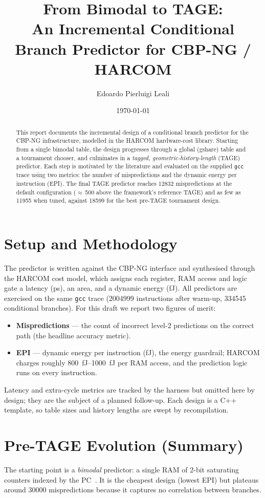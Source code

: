 \documentclass[11pt]{article}
\title{\vspace{-1.0cm}From Bimodal to TAGE:\\
An Incremental Conditional Branch Predictor for CBP-NG / HARCOM}
\author{Edoardo Pierluigi Leali}
\date{\today}
\newcommand{\code}[1]{\texttt{\small #1}}
\begin{document}
\maketitle
\vspace{-0.6cm}

\begin{abstract}
\noindent
This report documents the incremental design of a conditional branch predictor
for the CBP-NG infrastructure, modelled in the HARCOM hardware-cost library.
Starting from a single bimodal table, the design progresses through a global
(gshare) table and a tournament chooser, and culminates in a \emph{tagged,
geometric-history-length} (TAGE) predictor. Each step is motivated by the
literature and evaluated on the supplied \code{gcc} trace using two metrics:
the number of mispredictions and the dynamic energy per instruction (EPI). The
final TAGE predictor reaches \num{12832} mispredictions at the default
configuration ($\approx$\,500 above the framework's reference TAGE) and as few
as \num{11955} when tuned, against \num{18599} for the best pre-TAGE tournament
design.
\end{abstract}

\section{Setup and Methodology}
The predictor is written against the CBP-NG interface and synthesised through
the HARCOM cost model, which assigns each register, RAM access and logic gate a
latency (ps), an area, and a dynamic energy (fJ). All predictors are exercised
on the same \code{gcc} trace (\num{2004999} instructions after warm-up,
\num{334545} conditional branches). For this draft we report two figures of
merit:
\begin{itemize}
  \item \textbf{Mispredictions} --- the count of incorrect level-2 predictions
  on the correct path (the headline accuracy metric).
  \item \textbf{EPI} --- dynamic energy per instruction (fJ), the energy
  guardrail; HARCOM charges roughly \SIrange{800}{1000}{fJ} per RAM access, and
  the prediction logic runs on every instruction.
\end{itemize}
Latency and extra-cycle metrics are tracked by the harness but omitted here by
design; they are the subject of a planned follow-up. Each design is a C++
template, so table sizes and history lengths are swept by recompilation.

\section{Pre-TAGE Evolution (Summary)}
The starting point is a \emph{bimodal} predictor: a single RAM of 2-bit
saturating counters indexed by the PC~\cite{smith1981}. It is the cheapest
design (lowest EPI) but plateaus around \num{30000} mispredictions because it
captures no correlation between branches.
\end{document}
